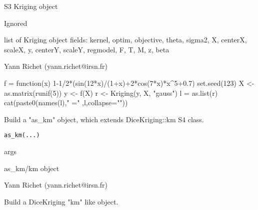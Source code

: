 \documentclass[letterpaper]{book}
\begin{document}
%
\begin{Arguments}
\begin{ldescription}
\item[\code{x}] S3 Kriging object

\item[\code{...}] Ignored
\end{ldescription}
\end{Arguments}
%
\begin{Value}
list of Kriging object fields: kernel, optim, objective, theta, sigma2, X, centerX, scaleX, y, centerY, scaleY, regmodel, F, T, M, z, beta
\end{Value}
%
\begin{Author}\relax
Yann Richet (yann.richet@irsn.fr)
\end{Author}
%
\begin{Examples}
\begin{ExampleCode}
f = function(x) 1-1/2*(sin(12*x)/(1+x)+2*cos(7*x)*x^5+0.7)
set.seed(123)
X <- as.matrix(runif(5))
y <- f(X)
r <- Kriging(y, X, "gauss")
l = as.list(r)
cat(paste0(names(l)," =" ,l,collapse="\n"))
\end{ExampleCode}
\end{Examples}
%
\begin{Description}\relax
Build a "as\_km" object, which extends DiceKriging::km S4 class.
\end{Description}
%
\begin{Usage}
\begin{verbatim}
as_km(...)
\end{verbatim}
\end{Usage}
%
\begin{Arguments}
\begin{ldescription}
\item[\code{...}] args
\end{ldescription}
\end{Arguments}
%
\begin{Value}
as\_km/km object
\end{Value}
%
\begin{Author}\relax
Yann Richet (yann.richet@irsn.fr)
\end{Author}
%
\begin{Description}\relax
Build a DiceKriging "km" like object.
\end{Description}
\end{document}

